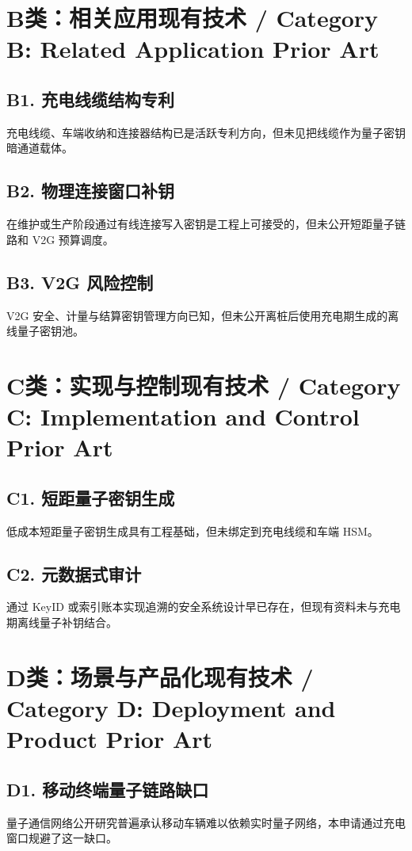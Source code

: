﻿\documentclass[12pt,a4paper]{article}
\begin{document}
\section{B类：相关应用现有技术 / Category B: Related Application Prior Art}
\subsection{B1. 充电线缆结构专利}
充电线缆、车端收纳和连接器结构已是活跃专利方向，但未见把线缆作为量子密钥暗通道载体。

\subsection{B2. 物理连接窗口补钥}
在维护或生产阶段通过有线连接写入密钥是工程上可接受的，但未公开短距量子链路和 V2G 预算调度。

\subsection{B3. V2G 风险控制}
V2G 安全、计量与结算密钥管理方向已知，但未公开离桩后使用充电期生成的离线量子密钥池。

\section{C类：实现与控制现有技术 / Category C: Implementation and Control Prior Art}
\subsection{C1. 短距量子密钥生成}
低成本短距量子密钥生成具有工程基础，但未绑定到充电线缆和车端 HSM。

\subsection{C2. 元数据式审计}
通过 KeyID 或索引账本实现追溯的安全系统设计早已存在，但现有资料未与充电期离线量子补钥结合。

\section{D类：场景与产品化现有技术 / Category D: Deployment and Product Prior Art}
\subsection{D1. 移动终端量子链路缺口}
量子通信网络公开研究普遍承认移动车辆难以依赖实时量子网络，本申请通过充电窗口规避了这一缺口。
\end{document}
